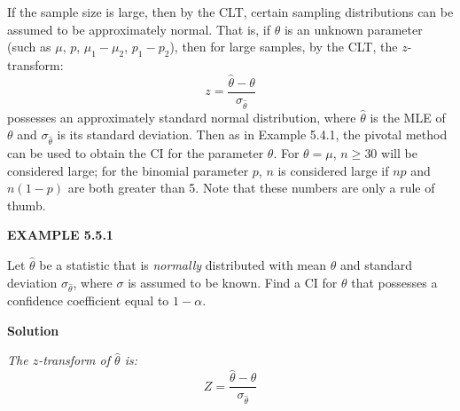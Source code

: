 If the sample size is large, then by the CLT, certain sampling distributions can be assumed to be approximately normal. That is, if $\theta$ is an unknown parameter (such as $\mu$, $p$, $\mu_1 - \mu_2$, $p_1 - p_2$), then for large samples, by the CLT, the $z$-transform:
\[
z = \frac{\widehat{\theta} - \theta}{\sigma_{\widehat{\theta}}}
\]
possesses an approximately standard normal distribution, where $\widehat{\theta}$ is the MLE of $\theta$ and $\sigma_{\widehat{\theta}}$ is its standard deviation. Then as in Example 5.4.1, the pivotal method can be used to obtain the CI for the parameter $\theta$. For $\theta = \mu$, $n \geq 30$ will be considered large; for the binomial parameter $p$, $n$ is considered large if $np$ and $n(1 - p)$ are both greater than 5. Note that these numbers are only a rule of thumb.

\begin{center}
\end{center}

\medskip

\noindent\textbf{EXAMPLE 5.5.1}

Let $\widehat{\theta}$ be a statistic that is \textit{normally} distributed with mean $\theta$ and standard deviation $\sigma_{\widehat{\theta}}$, where $\sigma$ is assumed to be known. Find a CI for $\theta$ that possesses a confidence coefficient equal to $1 - \alpha$.

\noindent\textbf{Solution}

\textit{The $z$-transform of $\widehat{\theta}$ is:}
\[
Z = \frac{\widehat{\theta} - \theta}{\sigma_{\widehat{\theta}}}
\]
